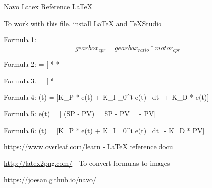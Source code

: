 \documentclass{article}
\begin{document}
Navo Latex Reference \LaTeX

To work with this file, install LaTeX and TeXStudio

Formula 1:
\[ gearbox_{cpr} = gearbox_{ratio} * motor_{cpr} \]

Formula 2:
\rpm = [ *  * \]

Formula 3:
\rpm = [ * \]

Formula 4:
\output(t) = [K_{P} * e(t) + K_{I} \int\limits_0^t e(t) \ dt \ + K_{D} *  e(t)]

Formula 5:
 e(t) = [ (SP - PV) =  SP -  PV = -  PV]

Formula 6:
\output(t) = [K_{P} * e(t) + K_{I} \int\limits_0^t e(t) \ dt \ - K_{D} *  PV]

\url{https://www.overleaf.com/learn} - LaTeX reference docu

\url{http://latex2png.com/} - To convert formulas to images

\url{https://joesan.github.io/navo/}
\end{document}
